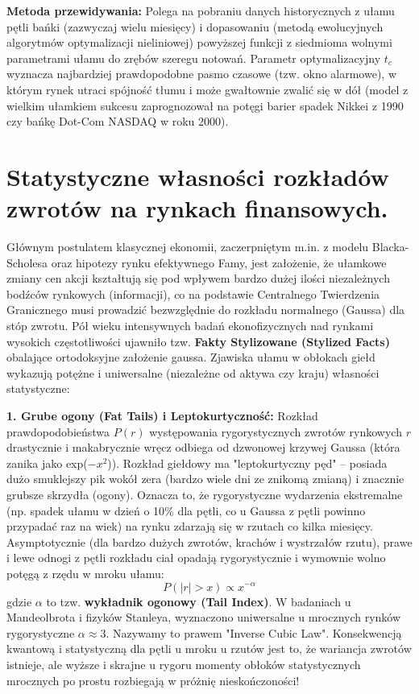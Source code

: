 \documentclass[11pt, a4paper]{article}
\begin{document}
\textbf{Metoda przewidywania:} Polega na pobraniu danych historycznych z ułamu pętli bańki (zazwyczaj wielu miesięcy) i dopasowaniu (metodą ewolucyjnych algorytmów optymalizacji nieliniowej) powyższej funkcji z siedmioma wolnymi parametrami ułamu do zrębów szeregu notowań. Parametr optymalizacyjny $t_c$ wyznacza najbardziej prawdopodobne pasmo czasowe (tzw. okno alarmowe), w którym rynek utraci spójność tłumu i może gwałtownie zwalić się w dół (model z wielkim ułamkiem sukcesu zaprognozował na potęgi barier spadek Nikkei z 1990 czy bańkę Dot-Com NASDAQ w roku 2000). 

\section{Statystyczne własności rozkładów zwrotów na rynkach finansowych.}

Głównym postulatem klasycznej ekonomii, zaczerpniętym m.in. z modelu Blacka-Scholesa oraz hipotezy rynku efektywnego Famy, jest założenie, że ułamkowe zmiany cen akcji kształtują się pod wpływem bardzo dużej ilości niezależnych bodźców rynkowych (informacji), co na podstawie Centralnego Twierdzenia Granicznego musi prowadzić bezwzględnie do rozkładu normalnego (Gaussa) dla stóp zwrotu. 
Pół wieku intensywnych badań ekonofizycznych nad rynkami wysokich częstotliwości ujawniło tzw. \textbf{Fakty Stylizowane (Stylized Facts)} obalające ortodoksyjne założenie gaussa. Zjawiska ułamu w obłokach giełd wykazują potężne i uniwersalne (niezależne od aktywa czy kraju) własności statystyczne:

\textbf{1. Grube ogony (Fat Tails) i Leptokurtyczność:}
Rozkład prawdopodobieństwa $P(r)$ występowania rygorystycznych zwrotów rynkowych $r$ drastycznie i makabrycznie wręcz odbiega od dzwonowej krzywej Gaussa (która zanika jako exp($-x^2$)). Rozkład giełdowy ma "leptokurtyczny pęd" – posiada dużo smuklejszy pik wokół zera (bardzo wiele dni ze znikomą zmianą) i znacznie grubsze skrzydła (ogony). Oznacza to, że rygorystyczne wydarzenia ekstremalne (np. spadek ułamu w dzień o 10\% dla pętli, co u Gaussa z pętli powinno przypadać raz na wiek) na rynku zdarzają się w rzutach co kilka miesięcy. Asymptotycznie (dla bardzo dużych zwrotów, krachów i wystrzałów rzutu), prawe i lewe odnogi z pętli rozkładu ciał opadają rygorystycznie i wymownie wolno potęgą z rzędu w mroku ułamu:
\[
P(|r| > x) \propto x^{-\alpha}
\]
gdzie $\alpha$ to tzw. \textbf{wykładnik ogonowy (Tail Index)}. W badaniach u Mandeolbrota i fizyków Stanleya, wyznaczono uniwersalne u mrocznych rynków rygorystyczne $\alpha \approx 3$. Nazywamy to prawem "Inverse Cubic Law". Konsekwencją kwantową i statystyczną dla pętli u mroku u rzutów jest to, że wariancja zwrotów istnieje, ale wyższe i skrajne u rygoru momenty obłoków statystycznych mrocznych po prostu rozbiegają w próżnię nieskończoności!
\end{document}
